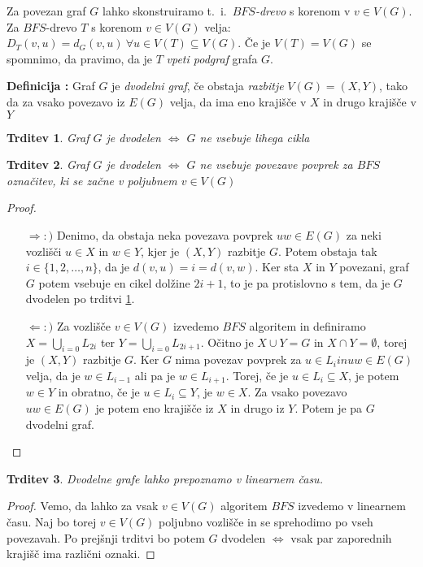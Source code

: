 \documentclass[a4paper, 10pt]{article}
\newtheorem{trditev}{Trditev}
\newcounter{defcount}
\newenvironment{definicija}{\begin{flushleft}\stepcounter{defcount}\textbf{Definicija \arabic{defcount}:}}{\hfill\end{flushleft}}
\newcommand{\pojem}[1]{\emph{#1}}
\begin{document}
	Za povezan graf $G$ lahko skonstruiramo t.~i.~\pojem{$BFS$-drevo} s korenom v $v\in V(G)$. Za $BFS$-drevo $T$ s korenom $v\in V(G)$ velja: $D_T(v, u) = d_G(v, u)~\forall u\in V(T)\subseteq V(G)$. Če je $V(T) = V(G)$ se spomnimo, da pravimo, da je $T$ \pojem{vpeti podgraf} grafa $G$.
	\begin{definicija}
		Graf $G$ je \pojem{dvodelni graf}, če obstaja \pojem{razbitje} $V(G) = (X, Y)$, tako da za vsako povezavo iz $E(G)$ velja, da ima eno krajišče v $X$ in drugo krajišče v $Y$
	\end{definicija}
	\begin{trditev}
		\label{trd:dvodelgraf1}
		Graf $G$ je dvodelen $\iff$ $G$ ne vsebuje lihega cikla
	\end{trditev}
	\begin{trditev}
		Graf $G$ je dvodelen $\iff$ $G$ ne vsebuje povezave povprek za $BFS$ označitev, ki se začne v poljubnem $v\in V(G)$
	\end{trditev}
	\begin{proof}
		\begin{itemize}
			\item[$\Rightarrow:)$] Denimo, da obstaja neka povezava povprek $uw\in E(G)$ za neki vozlišči $u\in X$ in $w\in Y$, kjer je $(X, Y)$ razbitje $G$. Potem obstaja tak $i\in \{1, 2, \ldots, n\}$, da je $d(v, u) = i =d(v, w)$. Ker sta $X$ in $Y$ povezani, graf $G$ potem vsebuje en cikel dolžine $2i + 1$, to je pa protislovno s tem, da je $G$ dvodelen po trditvi \ref{trd:dvodelgraf1}.
			\item[$\Leftarrow:)$] Za vozlišče $v\in V(G)$ izvedemo $BFS$ algoritem in definiramo $X = \bigcup_{i = 0} L_{2i}$ ter $Y = \bigcup_{i = 0}L_{2i+1}$. Očitno je $X\cup Y = G$ in $X\cap Y = \emptyset$, torej je $(X, Y)$ razbitje $G$. Ker $G$ nima povezav povprek za $u\in L_i in uw\in E(G)$ velja, da je $w\in L_{i-1}$ ali pa je $w\in L_{i+1}$. Torej, če je $u\in L_i \subseteq X$, je potem $w\in Y$ in obratno, če je $u\in L_i \subseteq Y$, je $w\in X$. Za vsako povezavo $uw\in E(G)$ je potem eno krajišče iz $X$ in drugo iz $Y$. Potem je pa $G$ dvodelni graf.
		\end{itemize}
	\end{proof}
	\begin{trditev}
		Dvodelne grafe lahko prepoznamo v linearnem času.
	\end{trditev}
	\begin{proof}
		Vemo, da lahko za vsak $v\in V(G)$ algoritem $BFS$ izvedemo v linearnem času. Naj bo torej $v\in V(G)$ poljubno vozlišče in se sprehodimo po vseh povezavah. Po prejšnji trditvi bo potem $G$ dvodelen $\iff$ vsak par zaporednih krajišč ima različni oznaki.
	\end{proof}
\end{document}
